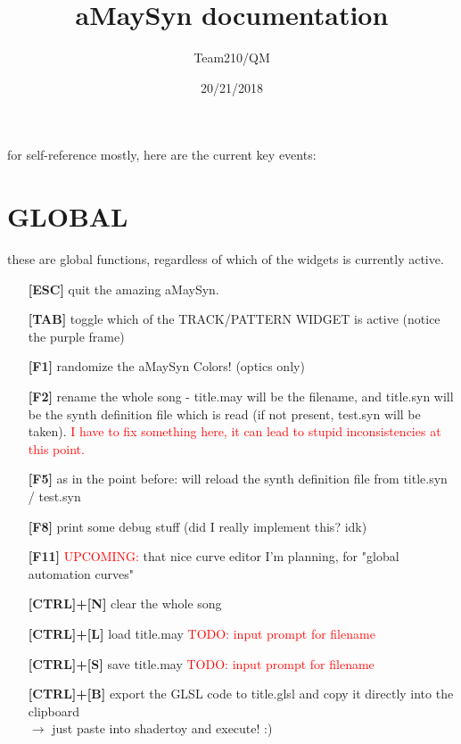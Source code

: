 \documentclass[11pt]{article}
\title{aMaySyn documentation}
\author{Team210/QM}
\date{20/21/2018}
\begin{document}
\maketitle

for self-reference mostly, here are the current key events:

\section{GLOBAL}
  these are global functions, regardless of which of the widgets is currently active.
    \begin{itemize}
      \item[\textbf{[ESC]}] quit the amazing aMaySyn.
      \item[\textbf{[TAB]}] toggle which of the TRACK/PATTERN WIDGET is active (notice the purple frame)
      \item[\textbf{[F1]}] randomize the aMaySyn Colors! (optics only)
      \item[\textbf{[F2]}] rename the whole song - title.may will be the filename, and title.syn will be the synth definition file which is read (if not present, test.syn will be taken). \textcolor{red}{I have to fix something here, it can lead to stupid inconsistencies at this point.}
      \item[\textbf{[F5]}] as in the point before: will reload the synth definition file from title.syn / test.syn
      \item[\textbf{[F8]}] print some debug stuff (did I really implement this? idk)
      \item[\textbf{[F11]}] \textcolor{red}{UPCOMING:} that nice curve editor I'm planning, for "global automation curves"
      \item[\textbf{[CTRL]+[N]}] clear the whole song
      \item[\textbf{[CTRL]+[L]}] load title.may \textcolor{red}{TODO: input prompt for filename}
      \item[\textbf{[CTRL]+[S]}] save title.may \textcolor{red}{TODO: input prompt for filename}
      \item[\textbf{[CTRL]+[B]}] export the GLSL code to title.glsl and copy it directly into the clipboard\\$\rightarrow$ just paste into shadertoy and execute! :)
    \end{itemize}
\end{document}
